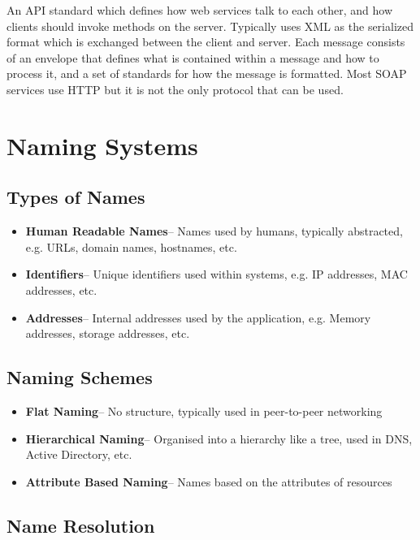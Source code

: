 An API standard which defines how web services talk to each other, and how clients should invoke methods on the server. Typically uses XML as the serialized format which is exchanged between the client and server. Each message consists of an envelope that defines what is contained within a message and how to process it, and a set of standards for how the message is formatted. Most SOAP services use HTTP but it is not the only protocol that can be used.

\section*{Naming Systems}

\subsection*{Types of Names}

\begin{itemize}
  \item \textbf{Human Readable Names}-- Names used by humans, typically abstracted, e.g. URLs, domain names, hostnames, etc.
  \item \textbf{Identifiers}-- Unique identifiers used within systems, e.g. IP addresses, MAC addresses, etc.
  \item \textbf{Addresses}-- Internal addresses used by the application, e.g. Memory addresses, storage addresses, etc.
\end{itemize}

\subsection*{Naming Schemes}

\begin{itemize}
  \item \textbf{Flat Naming}-- No structure, typically used in peer-to-peer networking
  \item \textbf{Hierarchical Naming}-- Organised into a hierarchy like a tree, used in DNS, Active Directory, etc.
  \item \textbf{Attribute Based Naming}-- Names based on the attributes of resources
\end{itemize}

\subsection*{Name Resolution}


